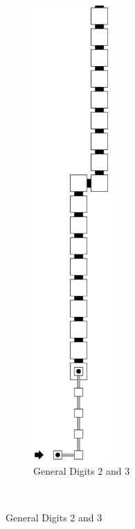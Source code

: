 \begin{itemize}
\begin{figure}[H]
\begin{subfigure}[t]{0.32\textwidth}
                \includegraphics[width=0.32\textwidth]{warping_post_warp_general_digit2and3}
                \caption{\label{fig:post_warp_general_digit2and3} General Digits 2 and 3 }
            \end{subfigure}%
            ~


\end{figure}
\end{itemize}
